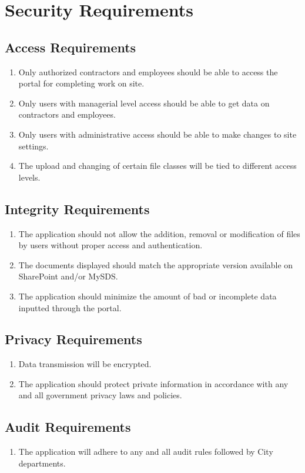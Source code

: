 \documentclass[12pt]{article}
\begin{document}
\section{Security Requirements}
\subsection{Access Requirements}
\begin{enumerate} [{SR-AR}1.]
  \item Only authorized contractors and employees should be able to access the
    portal for completing work on site.
  \item Only users with managerial level access should be able to get data on
    contractors and employees.
  \item Only users with administrative access should be able to make changes to
    site settings.
  \item The upload and changing of certain file classes will be tied to
    different access levels.
\end{enumerate}
\subsection{Integrity Requirements}
\begin{enumerate} [{SR-IR}1.]
  \item The application should not allow the addition, removal or modification
    of files by users without proper access and authentication.
  \item The documents displayed should match the appropriate version available
    on SharePoint and/or MySDS.
  \item The application should minimize the amount of bad or incomplete data
    inputted through the portal.
\end{enumerate}
\subsection{Privacy Requirements}
\begin{enumerate} [{SR-PR}1.]
  \item Data transmission will be encrypted.
  \item The application should protect private information in accordance with
    any and all government privacy laws and policies.
\end{enumerate}
\subsection{Audit Requirements}
\begin{enumerate} [{SR-AR}1.]
  \item The application will adhere to any and all audit rules followed by City
    departments.
\end{enumerate}
\end{document}
